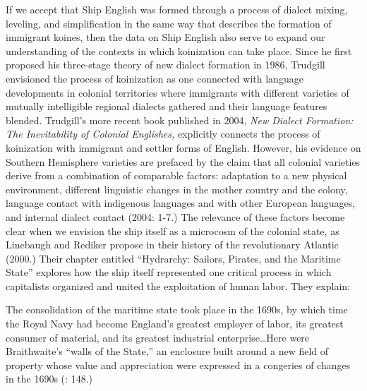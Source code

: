   If we accept that Ship English was formed through a process of dialect mixing, leveling, and simplification in the same way that \citet{Trudgill1986} describes the formation of immigrant koines, then the data on Ship English also serve to expand our understanding of the contexts in which koinization can take place. Since he first proposed his three-stage theory of new dialect formation in 1986, Trudgill envisioned the process of koinization as one connected with language developments in colonial territories where immigrants with different varieties of mutually intelligible regional dialects gathered and their language features blended. Trudgill’s more recent book published in 2004, \textit{New Dialect Formation: The Inevitability of Colonial Englishes,} explicitly connects the process of koinization with immigrant and settler forms of English. However, his evidence on Southern Hemisphere varieties are prefaced by the claim that all colonial varieties derive from a combination of comparable factors: adaptation to a new physical environment, different linguistic changes in the mother country and the colony, language contact with indigenous languages and with other European languages, and internal dialect contact (2004: 1-7.) The relevance of these factors become clear when we envision the ship itself as a microcosm of the colonial state, as Linebaugh and Rediker propose in their history of the revolutionary Atlantic (2000.) Their chapter entitled “Hydrarchy: Sailors, Pirates, and the Maritime State” explores how the ship itself represented one critical process in which capitalists organized and united the exploitation of human labor. They explain:

The consolidation of the maritime state took place in the 1690s, by which time the Royal Navy had become England’s greatest employer of labor, its greatest consumer of material, and its greatest industrial enterprise…Here were Braithwaite’s “walls of the State,” an enclosure built around a new field of property whose value and appreciation were expressed in a congeries of changes in the 1690s (\citealt{LinebaughRediker2004}: 148.)

